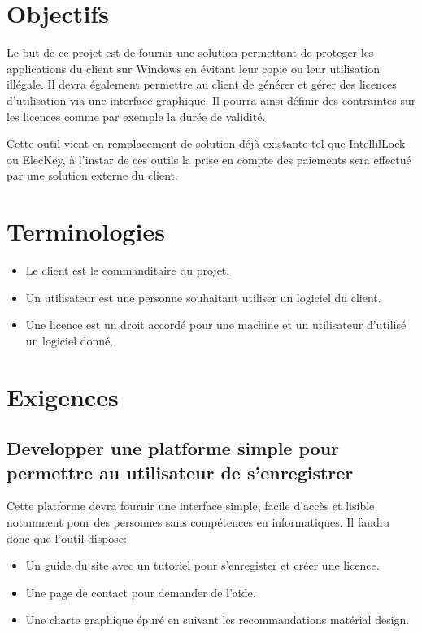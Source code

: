 \chapter{Objectifs}

Le but de ce projet est de fournir une solution permettant de proteger les applications
du client sur Windows en évitant leur copie ou leur utilisation illégale. 
Il devra également permettre au client de générer et gérer des licences d'utilisation 
via une interface graphique. Il pourra ainsi définir des contraintes sur les licences 
comme par exemple la durée de validité. \newline

Cette outil vient en remplacement de solution déjà existante tel que IntellilLock ou ElecKey,
à l'instar de ces outils la prise en compte des paiements sera effectué par une solution externe
du client.

\chapter{Terminologies}

\begin{itemize}
	\item Le client est le commanditaire du projet.
	\item Un utilisateur est une personne souhaitant utiliser un logiciel du client. 
	\item Une licence est un droit accordé pour une machine et un utilisateur d'utilisé un logiciel donné.
\end{itemize}

\chapter{Exigences}

\section{Developper une platforme simple pour permettre au utilisateur de s'enregistrer}
Cette platforme devra fournir une interface simple, facile d'accès et lisible notamment 
pour des personnes sans compétences en informatiques. Il faudra donc que l'outil dispose:
\begin{itemize}
	\item Un guide du site avec un tutoriel pour s'enregister et créer une licence.
	\item Une page de contact pour demander de l'aide.
	\item Une charte graphique épuré en suivant les recommandations matérial design.
\end{itemize}

